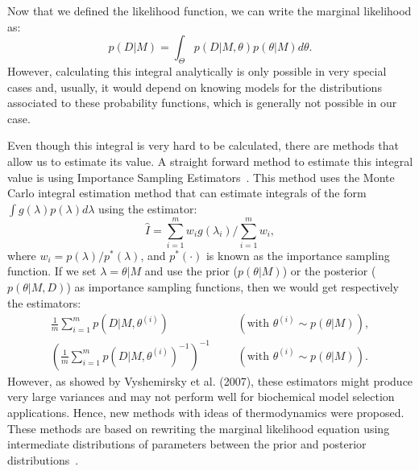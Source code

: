 Now that we defined the likelihood function, we can write the marginal 
likelihood as:
\begin{equation}
    p (D | M) = \int_{\Theta} p (D | M, \theta) p (\theta | M)d\theta.
\label{eq:marginal_likelihood}
\end{equation}
However, calculating this integral analytically is only possible in 
very special cases and, usually, it would depend on knowing models for 
the distributions associated to these probability functions, which is 
generally not possible in our case.

Even though this integral is very hard to be calculated, there are 
methods that allow us to estimate its value. A straight forward method 
to estimate this integral value is using Importance Sampling 
Estimators~\cite{Newton1993}. This method uses the Monte Carlo integral 
estimation method that can estimate integrals of the form 
$\int g(\lambda) p(\lambda)d\lambda$ using the estimator:
\begin{equation*}
    \hat{I} = \sum_{i = 1}^m w_i g(\lambda_i) / \sum_{i = 1}^m w_i,
\label{eq:importance_sampling_estimator}
\end{equation*}
where $w_i = p (\lambda) / p^* (\lambda)$, and $p^*(\cdot)$ is known as 
the importance sampling function. If we set $\lambda = \theta | M$ and
use the prior ($p(\theta | M)$) or the posterior ($p(\theta | M, D)$) as 
importance sampling functions, then we would get respectively the 
estimators:
\begin{equation*}
\begin{aligned}
    \frac{1}{m} \sum_{i = 1}^m p(D|M, \theta^{(i)}) &&& 
        (\text{with } \theta^{(i)} \sim p(\theta|M)), \\
    \left(\frac{1}{m} \sum_{i = 1}^m p(D|M, \theta^{(i)})^{-1} \right)^{-1} &&&
        (\text{with } \theta^{(i)} \sim p(\theta|M)).
\end{aligned}
\end{equation*}
However, as showed by Vyshemirsky et al. (2007), these estimators might
produce very large variances and may not perform well for biochemical
model selection applications. Hence, new methods with ideas of 
thermodynamics were proposed. These methods are based on rewriting the
marginal likelihood equation using intermediate distributions of 
parameters between the prior and posterior 
distributions~\cite{Friel2008}.

